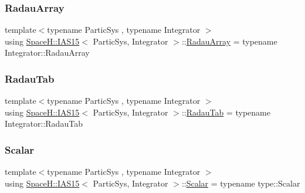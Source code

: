 \subsubsection{\texorpdfstring{Radau\+Array}{RadauArray}}
{\footnotesize\ttfamily template$<$typename Partic\+Sys , typename Integrator $>$ \\
using \mbox{\hyperlink{class_space_h_1_1_i_a_s15}{Space\+H\+::\+I\+A\+S15}}$<$ Partic\+Sys, Integrator $>$\+::\mbox{\hyperlink{class_space_h_1_1_i_a_s15_a1eda622ee773ed5b2dff783600e1f7f7}{Radau\+Array}} =  typename Integrator\+::\+Radau\+Array}

\mbox{\label{class_space_h_1_1_i_a_s15_a4023c69d2644098aa8d75181f6a82fc7}} 
\subsubsection{\texorpdfstring{Radau\+Tab}{RadauTab}}
{\footnotesize\ttfamily template$<$typename Partic\+Sys , typename Integrator $>$ \\
using \mbox{\hyperlink{class_space_h_1_1_i_a_s15}{Space\+H\+::\+I\+A\+S15}}$<$ Partic\+Sys, Integrator $>$\+::\mbox{\hyperlink{class_space_h_1_1_i_a_s15_a4023c69d2644098aa8d75181f6a82fc7}{Radau\+Tab}} =  typename Integrator\+::\+Radau\+Tab}

\mbox{\label{class_space_h_1_1_i_a_s15_ac4ee5f40852d7b500ca50084eb35b012}} 
\subsubsection{\texorpdfstring{Scalar}{Scalar}}
{\footnotesize\ttfamily template$<$typename Partic\+Sys , typename Integrator $>$ \\
using \mbox{\hyperlink{class_space_h_1_1_i_a_s15}{Space\+H\+::\+I\+A\+S15}}$<$ Partic\+Sys, Integrator $>$\+::\mbox{\hyperlink{class_space_h_1_1_i_a_s15_ac4ee5f40852d7b500ca50084eb35b012}{Scalar}} =  typename type\+::\+Scalar}

\mbox{\label{class_space_h_1_1_i_a_s15_a17ef1472c0db7e9fdafffed41e5b9a3b}} 
